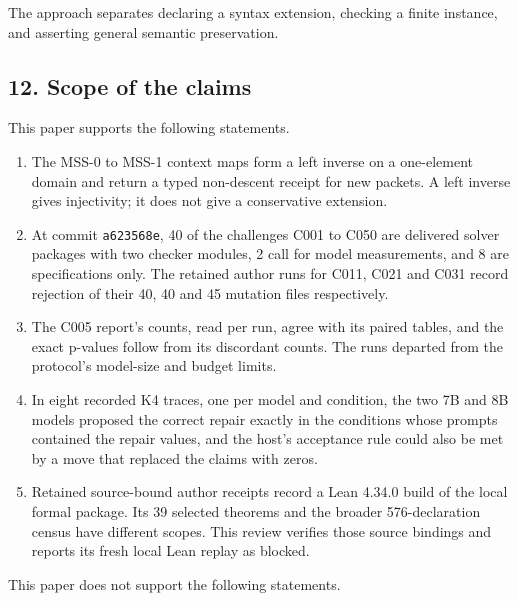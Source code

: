 \documentclass[
  11pt,
]{article}
\newcommand{\passthrough}[1]{#1}
\providecommand{\tightlist}{%
  \setlength{\itemsep}{0pt}\setlength{\parskip}{0pt}}
\begin{document}
The approach separates declaring a syntax extension, checking a finite
instance, and asserting general semantic preservation.

\hypertarget{scope-of-the-claims}{%
\subsection{12. Scope of the claims}\label{scope-of-the-claims}}

This paper supports the following statements.

\begin{enumerate}
\def\labelenumi{\arabic{enumi}.}
\tightlist
\item
  The MSS-0 to MSS-1 context maps form a left inverse on a one-element
  domain and return a typed non-descent receipt for new packets. A left
  inverse gives injectivity; it does not give a conservative extension.
\item
  At commit \passthrough{\lstinline!a623568e!}, 40 of the challenges
  C001 to C050 are delivered solver packages with two checker modules, 2
  call for model measurements, and 8 are specifications only. The
  retained author runs for C011, C021 and C031 record rejection of their
  40, 40 and 45 mutation files respectively.
\item
  The C005 report's counts, read per run, agree with its paired tables,
  and the exact p-values follow from its discordant counts. The runs
  departed from the protocol's model-size and budget limits.
\item
  In eight recorded K4 traces, one per model and condition, the two 7B
  and 8B models proposed the correct repair exactly in the conditions
  whose prompts contained the repair values, and the host's acceptance
  rule could also be met by a move that replaced the claims with zeros.
\item
  Retained source-bound author receipts record a Lean 4.34.0 build of
  the local formal package. Its 39 selected theorems and the broader
  576-declaration census have different scopes. This review verifies
  those source bindings and reports its fresh local Lean replay as
  blocked.
\end{enumerate}

This paper does not support the following statements.
\end{document}
